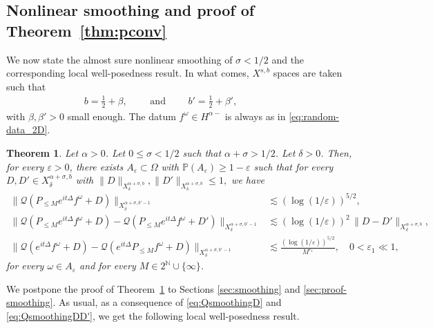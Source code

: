\documentclass[11pt, xcolor = dvipsnames,reqno
]{amsart}
\newtheorem{thm}{Theorem}[section]
\theoremstyle{definition}
\theoremstyle{remark}
\begin{document}
    \subsection{Nonlinear smoothing and proof of Theorem~\ref{thm:pconv}}
    \label{sec:NonlinearSmoothing_and_ProofOfTheorem}

    We now state the almost sure nonlinear smoothing of $ \sigma < 1/2$
    and the corresponding local well-posedness result. 
    In what comes, $X^{s,b}$ spaces are taken such that 
    \begin{align}
        b = \frac12 + \beta, 
        \qquad \text{ and } \qquad 
        b' = \frac12 + \beta', 
        \qquad \qquad 
    \end{align}
    with $\beta, \beta' > 0$ small enough.
    The datum $f^{\omega} \in H^{\alpha-}$ is always as in \eqref{eq:random-data_2D}. 
    

\begin{thm}\label{thm:to-pconv}
    Let $\alpha > 0$. 
    Let $0 \leq \sigma < 1/2$ 
    such that $\alpha + \sigma > 1/2$. 
    Let $\delta > 0$. 
    Then, for every $\varepsilon > 0$, there exists $A_\varepsilon \subset \Omega$ with $\mathbb{P}(A_{\varepsilon}) \geq 1- \varepsilon$ such that for every $D,D' \in X^{\alpha + \sigma,b}_\delta$ with 
    $
        \|D\|_{X^{\alpha + \sigma,b}_\delta}, \|D'\|_{X^{\alpha + \sigma,b}_\delta} \leq 1,
    $
    we have
\begin{align}
    \big\| \mathcal{Q}(P_{\leq M} e^{it\Delta}f^{\omega} + D) \big\|_{X^{\alpha + \sigma, b'-1}_\delta}
    & \lesssim (\log (1/\varepsilon))^{5/2}, \label{eq:QsmoothingD} \\
    \big\| \mathcal{Q}(P_{\leq M}e^{it\Delta} f^{\omega} + D) - \mathcal{Q}(P_{\leq M}e^{it\Delta} f^{\omega} + D') \big\|_{X^{\alpha + \sigma, b'-1}_{\delta}}  
    & \lesssim (\log (1/\varepsilon))^2 \,  \|D - D'\|_{X^{\alpha + \sigma,b}_{\delta}}, \label{eq:QsmoothingDD'} \\
    \big\| \mathcal{Q}(e^{it\Delta}f^{\omega} + D) - \mathcal{Q}(e^{it\Delta} P_{\leq M} f^\omega + D) \big\|_{X^{\alpha + \sigma, b'-1}_\delta} 
    & \lesssim \frac{(  \log (1/\varepsilon) )^{5/2}}{M^{\varepsilon_1}}, \quad 0 < \varepsilon_1 \ll 1, \label{eq:Qsmoothing_LinearDifference}
\end{align} 
for every $\omega \in A_{\varepsilon}$ and for every $M \in 2^{\mathbb N} \cup \{\infty\}$.
\end{thm}
We postpone the proof of Theorem~\ref{thm:to-pconv} to Sections \ref{sec:smoothing} and \ref{sec:proof-smoothing}.
%
As usual, as a consequence of \eqref{eq:QsmoothingD} and \eqref{eq:QsmoothingDD'}, we get the following local well-posedness result. 
\end{document}
